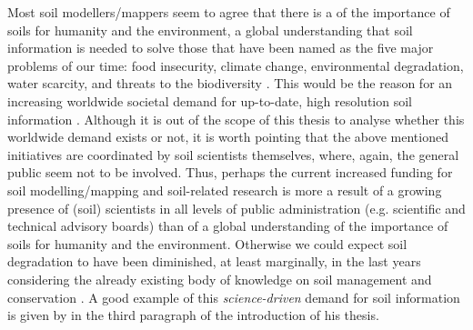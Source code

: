 Most soil modellers/mappers seem to agree that there is a  of the importance 
of soils for humanity and the environment, a global understanding that soil information is needed to solve 
those that have been named as the five major problems of our time: food insecurity, climate change, 
environmental degradation, water scarcity, and threats to the biodiversity \cite{SanchezEtAl2009}. 
This  would be the reason for an increasing worldwide societal demand for 
up-to-date, high resolution soil information \cite{OmutoEtAl2013}. Although it is out of the scope 
of this thesis to analyse whether this worldwide demand exists or not, it is worth pointing that the above 
mentioned initiatives are coordinated by soil scientists themselves, where, again, the general 
public seem not to be involved. Thus, perhaps the current increased funding for soil modelling/mapping and 
soil-related research is more a result of a growing presence of (soil) scientists in all levels of 
public administration (e.g. scientific and technical advisory boards) than of a global understanding
of the importance of soils for humanity and the environment. Otherwise we could expect soil 
degradation to have been diminished, at least marginally, in the last years considering the already 
existing body of knowledge on soil management and conservation \cite{Blanco-CanquiEtAl2010}. A good
example of this \emph{science-driven} demand for soil information is given by  in the 
third paragraph of the introduction of his thesis.

